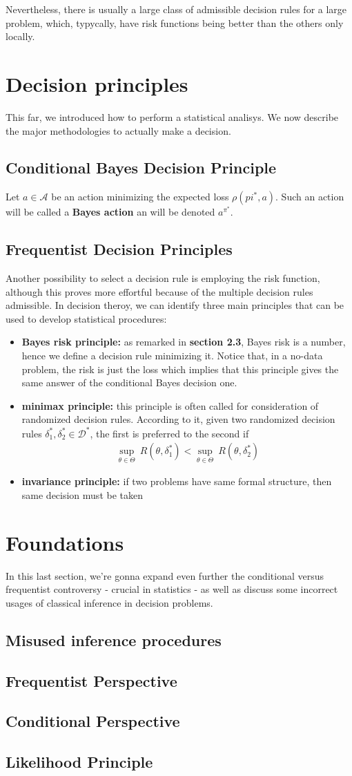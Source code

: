 \documentclass{article}
\begin{document}
	Nevertheless, there is usually a large class of admissible decision rules for a large problem, which,
	typycally, have risk functions being better than the others only locally.
	\section{Decision principles}
	This far, we introduced how to perform a statistical analisys. We now describe the major methodologies to actually make a decision. 
	\subsection{Conditional Bayes Decision Principle}
	Let $a \in \mathcal{A}$ be an action minimizing the expected loss $\rho(pi^*, a)$. Such an action will be called a \textbf{Bayes action} an will be denoted $a^{\pi^*}$. 
	\subsection{Frequentist Decision Principles}
	Another possibility to select a decision rule is employing the risk function, although this proves more  effortful because of the multiple decision rules admissible. In decision theroy, we can identify three main principles that can be used to develop statistical procedures:
	\begin{itemize}
		\item \textbf{Bayes risk principle:} as remarked in \textbf{section 2.3}, Bayes risk is a number, hence we define a decision rule minimizing it. Notice that, in a no-data problem, the risk is just the loss which implies that this principle gives the same answer of the conditional Bayes decision one.
		\item\textbf{minimax principle:} this principle is often called for consideration of randomized decision rules. According to it, given two randomized decision rules $\delta_1^*, \delta_2^* \in \mathcal{D^*}$, the first is preferred to the second if
		\begin{align*}
			\sup_{\theta \in \Theta} \ R(\theta, \delta_1^*) < 	\sup_{\theta \in \Theta} \ R(\theta, \delta_2^*)
		\end{align*} 
		\item \textbf{invariance principle:} if two problems have same formal structure, then same decision must be taken
	\end{itemize}
	\section{Foundations}
	In this last section, we're gonna expand even further the conditional versus frequentist controversy - crucial in statistics - as well as discuss some incorrect usages of classical inference in decision problems.
	\subsection{Misused inference procedures}
	\subsection{Frequentist Perspective}
	\subsection{Conditional Perspective}
	\subsection{Likelihood Principle}
\end{document}
